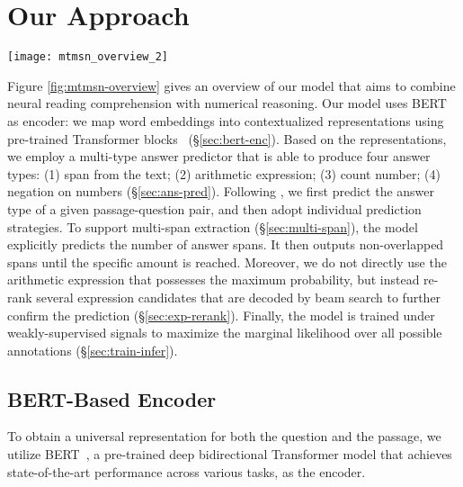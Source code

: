 \documentclass[11pt,a4paper]{article}
\begin{document}
 \section{Our Approach}
\begin{figure*}
\center
\texttt{[image: mtmsn\_overview\_2]}
\caption{An illustration of MTMSN architecture. 
The multi-type answer predictor supports four kinds of answer types including span, addition/subtraction, count, and negation.
A multi-span extraction method is proposed to dynamically produce one or several spans.
The arithmetic expression reranking mechanism aims to rank expression candidates that are decoded by beam search for further validating the prediction.}
\label{fig:mtmsn-overview}
\end{figure*}

Figure \ref{fig:mtmsn-overview} gives an overview of our model that aims to combine neural reading comprehension with numerical reasoning.
Our model uses BERT~\cite{devlin2018bert} as encoder: we map word embeddings into contextualized representations using pre-trained Transformer blocks~\cite{vaswani2017attention} (\S\ref{sec:bert-enc}).
Based on the representations, we employ a multi-type answer predictor that is able to produce four answer types: (1) span from the text; (2) arithmetic expression; (3) count number; (4) negation on numbers (\S\ref{sec:ans-pred}).
Following \citet{dua2019drop}, we first predict the answer type of a given passage-question pair, and then adopt individual prediction strategies.
To support multi-span extraction (\S\ref{sec:multi-span}), the model explicitly predicts the number of answer spans. It then outputs non-overlapped spans until the specific amount is reached.
Moreover, we do not directly use the arithmetic expression that possesses the maximum probability, but instead re-rank several expression candidates that are decoded by beam search to further confirm the prediction (\S\ref{sec:exp-rerank}).
Finally, the model is trained under weakly-supervised signals to maximize the marginal likelihood over all possible annotations (\S\ref{sec:train-infer}).

\subsection{BERT-Based Encoder 	\label{sec:bert-enc}}
To obtain a universal representation for both the question and the passage, we utilize BERT~\cite{devlin2018bert}, a pre-trained deep bidirectional Transformer model that achieves state-of-the-art performance across various tasks, as the encoder.
\end{document}
